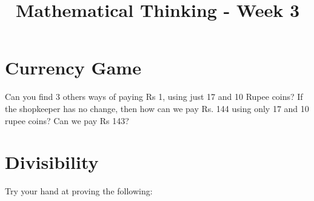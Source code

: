 \documentclass[12pt]{exam}
\title{Mathematical Thinking - Week 3}
\begin{document}
\maketitle
\tableofcontents
\section{Currency Game}
\begin{questions}
\question Can you find 3 others ways of paying Rs 1, using just 17 and 10 Rupee coins?
\question If the shopkeeper has no change, then how can we pay Rs. 144 using only 17 and 10 rupee coins? Can we pay Rs 143?
\end{questions}

\section{Divisibility}
\begin{questions}
\question Try your hand at proving the following:
\end{questions}
\end{document}
